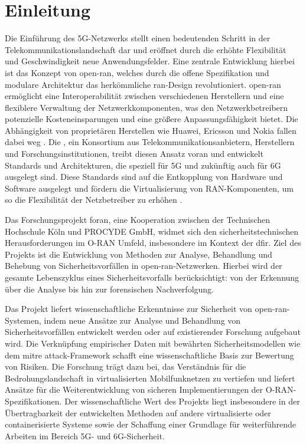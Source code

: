 \chapter{Einleitung}
\label{chap:Einleitung}

\par
Die Einführung des 5G-Netzwerks stellt einen bedeutenden Schritt in der Telekommunikationslandschaft dar und eröffnet durch die erhöhte Flexibilität und Geschwindigkeit neue Anwendungsfelder. Eine zentrale Entwicklung hierbei ist das Konzept von \gls{open-ran}, welches durch die offene Spezifikation und modulare Architektur das herkömmliche \gls{ran}-Design revolutioniert. \gls{open-ran} ermöglicht eine Interoperabilität zwischen verschiedenen Herstellern und eine flexiblere Verwaltung der Netzwerkkomponenten, was den Netzwerkbetreibern potenzielle Kosteneinsparungen und eine größere Anpassungsfähigkeit bietet. Die Abhängigkeit von proprietären Herstellen wie Huawei, Ericsson und Nokia fallen dabei weg \autocite{kimGeopoliticsNextGeneration2023}. Die \orana{}, ein Konsortium aus Telekommunikationsanbietern, Herstellern und Forschungsinstitutionen, treibt diesen Ansatz voran und entwickelt Standards und Architekturen, die speziell für 5G und zukünftig auch für 6G ausgelegt sind. Diese Standards sind auf die Entkopplung von Hardware und Software ausgelegt und fördern die Virtualisierung von RAN-Komponenten, um so die Flexibilität der Netzbetreiber zu erhöhen \autocite{o-ranallianceORANWhitePaper2018102018}.
\par
Das Forschungsprojekt \gls{foran}, eine Kooperation zwischen der Technischen Hochschule Köln und PROCYDE GmbH, widmet sich den sicherheitstechnischen Herausforderungen im O-RAN Umfeld, insbesondere im Kontext der \gls{dfir}. Ziel des Projekts ist die Entwicklung von Methoden zur Analyse, Behandlung und Behebung von Sicherheitsvorfällen in \gls{open-ran}-Netzwerken. Hierbei wird der gesamte Lebenszyklus eines Sicherheitsvorfalls berücksichtigt: von der Erkennung über die Analyse bis hin zur forensischen Nachverfolgung.
\par Das Projekt liefert wissenschaftliche Erkenntnisse zur Sicherheit von \gls{open-ran}-Systemen, indem neue Ansätze zur Analyse und Behandlung von Sicherheitsvorfällen entwickelt werden oder auf existierender Forschung aufgebaut wird. Die Verknüpfung empirischer Daten mit bewährten Sicherheitsmodellen wie dem \gls{mitre} \gls{attack}-Framework schafft eine wissenschaftliche Basis zur Bewertung von Risiken. Die Forschung trägt dazu bei, das Verständnis für die Bedrohungslandschaft in virtualisierten Mobilfunknetzen zu vertiefen und liefert Ansätze für die Weiterentwicklung von sicheren Implementierungen der O-RAN-Spezifikationen. Der wissenschaftliche Wert des Projekts liegt insbesondere in der Übertragbarkeit der entwickelten Methoden auf andere virtualisierte oder containerisierte Systeme sowie der Schaffung einer Grundlage für weiterführende Arbeiten im Bereich 5G- und 6G-Sicherheit.
